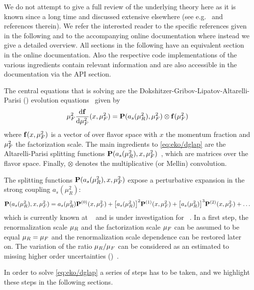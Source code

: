 
We do not attempt to give a full review of the underlying theory
here as it is known since a long time and discussed extensive elsewhere
(see e.g.\ \cite{Peskin:1995ev,Ellis:1996mzs} and references therein).
We refer the interested reader to the specific references given in the following and to
the accompanying online documentation where instead we give a detailed
overview. All sections in the following have an equivalent section in
the online documentation. Also the respective code implementations of the
various ingredients contain relevant information and are also accessible
in the documentation via the API section.

The central equations that \eko{} is solving are the
Dokshitzer-Gribov-Lipatov-Altarelli-Parisi (\dglap) evolution
equations~\cite{Altarelli:1977zs,Gribov:1972ri,Dokshitzer:1977sg} given by
\begin{equation}
	\muF^2 \dv{\vb f}{\muF^2}{}(x,\muF^2) = \vb P (a_s(\muR^2),\muF^2) \otimes \vb f(\muF^2)
	\label{eq:eko/dglap}
\end{equation}
where $\vb f(x,\mu_F^2)$ is a vector of \pdfs over flavor space with $x$ the
momentum fraction and $\mu_F^2$ the factorization scale.
The main ingredients to \cref{eq:eko/dglap} are the Altarelli-Parisi splitting
functions $\vb P(a_s(\mu_R^2),x,\mu_F^2)$~\cite{Moch:2004pa,Vogt:2004mw}, which
are matrices over the flavor space.
Finally, $\otimes$ denotes the multiplicative (or Mellin) convolution.

The splitting functions $\vb P(a_s(\mu_R^2),x,\mu_F^2)$ expose a perturbative
expansion in the strong coupling $a_s(\mu_R^2)$:
\begin{align}
	\vb P(a_s(\mu_R^2),x,\mu_F^2) = a_s(\mu_R^2) \vb P^{(0)}(x,\mu_F^2)
	+ \qty[a_s(\mu_R^2)]^2 \vb P^{(1)}(x,\mu_F^2)
	+ \qty[a_s(\mu_R^2)]^3 \vb P^{(2)}(x,\mu_F^2)
	+ \ldots
\end{align}
which is currently known at \nnlo{}~\cite{Moch:2004pa,Vogt:2004mw,Blumlein:2021enk} and is under
investigation for \nnnlo{}~\cite{Moch:2021qrk}.
In a first step, the renormalization scale $\mu_R$ and the factorization scale
$\mu_F$ can be assumed to be equal $\mu_R = \mu_F$ and the renormalization scale
dependence can be restored later on. The variation of the ratio $\mu_R/\mu_F$ can
be considered as an estimated to missing higher order
uncertainties (\mhou{})~\cite{AbdulKhalek:2019ihb}.

In order to solve \cref{eq:eko/dglap} a series of steps has to be taken, and we
highlight these steps in the following sections.

